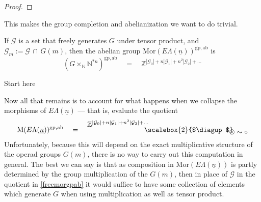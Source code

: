 \documentclass{amsbook} %
\newcommand{\bigquotient}[2]{ \raisebox{0.75\height}{$#1$} \mkern-12mu\scalebox{2}{$\diagup$}\mkern-10mu \raisebox{-0.5\height}{$#2$} }
\newcommand{\ELn}{E\Lambda(\underline{n})}
\numberwithin{section}{chapter}
\begin{document}
\begin{proof}


\end{proof}

This makes the group completion and abelianization we want to do trivial. 

\begin{cor} \label{freemorgpab} If $\mathcal{G}$ is a set that freely generates $G$ under tensor product, and $\mathcal{G}_m := \mathcal{G} \, \cap \,  G(m)$, then the abelian group $\mathrm{Mor}(\ELn)^{\mathrm{gp}, \mathrm{ab}}$ is 
\[ (G \times_{\mathbb{N}} \mathbb{N}^{\ast n})^{\mathrm{gp}, \mathrm{ab}} \quad = \quad \mathbb{Z}^{|\mathcal{G}_0| + n|\mathcal{G}_1| + n^2 |\mathcal{G}_2| + ...} \]
\end{cor}

Start here

Now all that remains is to account for what happens when we collapse the morphisms of $\ELn$ --- that is, evaluate the quotient
\[ \mathrm{M}(\ELn)^{\mathrm{gp}, \mathrm{ab}} \quad = \quad \bigquotient{\mathbb{Z}^{|\mathcal{G}_0| + n|\mathcal{G}_1| + n^2 |\mathcal{G}_2| + ...}}{\otimes \sim \circ} \]
Unfortunately, because this will depend on the exact multiplicative structure of the operad groups $G(m)$, there is no way to carry out this computation in general. The best we can say is that as composition in $\mathrm{Mor}(\ELn)$ is partly determined by the group multiplication of the $G(m)$, then in place of $\mathcal{G}$ in the quotient in \cref{freemorgpab} it would suffice to have some collection of elements which generate $G$ when using multiplication as well as tensor product.
\end{document}
